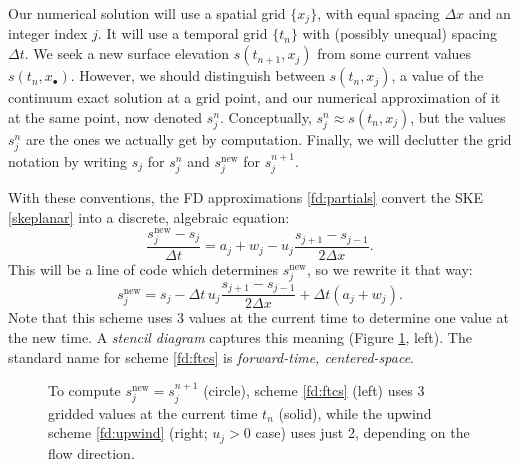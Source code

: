 \documentclass[letterpaper,final,12pt,reqno]{amsart}
\newcommand{\snew}{s^{\text{new}}}
\begin{document}
Our numerical solution will use a spatial grid $\{x_j\}$, with equal spacing $\Delta x$ and an integer index $j$.  It will use a temporal grid $\{t_n\}$ with (possibly unequal) spacing $\Delta t$.  We seek a new surface elevation $s(t_{n+1},x_j)$ from some current values $s(t_n,x_{\bullet})$.  However, we should distinguish between $s(t_n,x_j)$, a value of the continuum exact solution at a grid point, and our numerical approximation of it at the same point, now denoted $s_j^n$.  Conceptually, $s_j^n \approx s(t_n,x_j)$, but the values $s_j^n$ are the ones we actually get by computation.  Finally, we will declutter the grid notation by writing $s_j$ for $s_j^n$ and $\snew_j$ for $s_j^{n+1}$.

With these conventions, the FD approximations \eqref{fd:partials} convert the SKE \eqref{skeplanar} into a discrete, algebraic equation:
\begin{equation*}
\frac{\snew_j - s_j}{\Delta t} = a_j + w_j - u_j \frac{s_{j+1} - s_{j-1}}{2\Delta x}. \end{equation*}
This will be a line of code which determines $\snew_j$, so we rewrite it that way:
\begin{equation}
\snew_j = s_j - \Delta t\, u_j \frac{s_{j+1}-s_{j-1}}{2\Delta x} + \Delta t (a_j + w_j). \label{fd:ftcs}
\end{equation}
Note that this scheme uses 3 values at the current time to determine one value at the new time.  A \emph{stencil diagram} captures this meaning (Figure \ref{fig:stencils}, left).  The standard name for scheme \eqref{fd:ftcs} is \emph{forward-time, centered-space}.

\begin{figure}[ht]
 \quad 
\caption{To compute $\snew_j=s_j^{n+1}$ (circle), scheme \eqref{fd:ftcs} (left) uses 3 gridded values at the current time $t_n$ (solid), while the upwind scheme \eqref{fd:upwind} (right; $u_j>0$ case) uses just 2, depending on the flow direction.}
\label{fig:stencils}
\end{figure}
\end{document}

